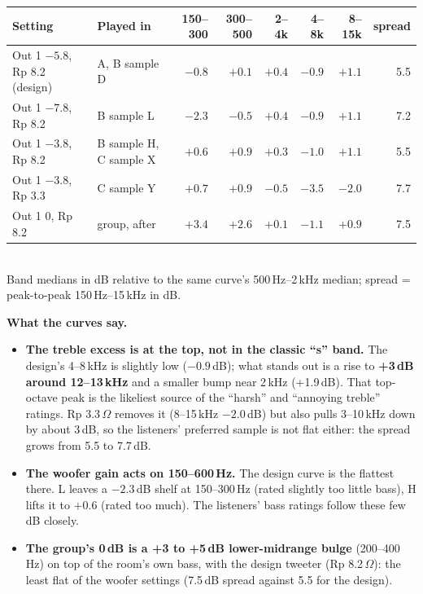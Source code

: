 \documentclass[11pt,a4paper]{article}
\begin{document}
\begin{center}\small
\begin{tabular}{@{}llrrrrrr@{}}\toprule
Setting & Played in & 150--300 & 300--500 & 2--4k & 4--8k & 8--15k & spread\\\midrule
Out 1 $-5.8$, Rp 8.2 (design) & A, B sample D & $-0.8$ & $+0.1$ & $+0.4$ & $-0.9$ & $+1.1$ & 5.5\\
Out 1 $-7.8$, Rp 8.2 & B sample L & $-2.3$ & $-0.5$ & $+0.4$ & $-0.9$ & $+1.1$ & 7.2\\
Out 1 $-3.8$, Rp 8.2 & B sample H, C sample X & $+0.6$ & $+0.9$ & $+0.3$ & $-1.0$ & $+1.1$ & 5.5\\
Out 1 $-3.8$, Rp 3.3 & C sample Y & $+0.7$ & $+0.9$ & $-0.5$ & $-3.5$ & $-2.0$ & 7.7\\
Out 1 0, Rp 8.2 & group, after & $+3.4$ & $+2.6$ & $+0.1$ & $-1.1$ & $+0.9$ & 7.5\\
\bottomrule
\end{tabular}\\[2pt]
{\footnotesize Band medians in dB relative to the same curve's 500\,Hz--2\,kHz median; spread = peak-to-peak
150\,Hz--15\,kHz in dB.}
\end{center}

\textbf{What the curves say.}
\begin{itemize}\setlength{\itemsep}{1pt}
\item \textbf{The treble excess is at the top, not in the classic ``s'' band.} The design's 4--8\,kHz is
slightly low ($-0.9$\,dB); what stands out is a rise to \textbf{+3\,dB around 12--13\,kHz} and a smaller bump
near 2\,kHz (+1.9\,dB). That top-octave peak is the likeliest source of the ``harsh'' and ``annoying treble''
ratings. Rp 3.3\,$\Omega$ removes it (8--15\,kHz $-2.0$\,dB) but also pulls 3--10\,kHz down by about 3\,dB,
so the listeners' preferred sample is not flat either: the spread grows from 5.5 to 7.7\,dB.
\item \textbf{The woofer gain acts on 150--600\,Hz.} The design curve is the flattest there. L leaves a
$-2.3$\,dB shelf at 150--300\,Hz (rated slightly too little bass), H lifts it to $+0.6$ (rated too much).
The listeners' bass ratings follow these few dB closely.
\item \textbf{The group's 0\,dB is a +3 to +5\,dB lower-midrange bulge} (200--400\,Hz) on top of the room's
own bass, with the design tweeter (Rp 8.2\,$\Omega$): the least flat of the woofer settings (7.5\,dB spread
against 5.5 for the design).
\end{itemize}
\end{document}
